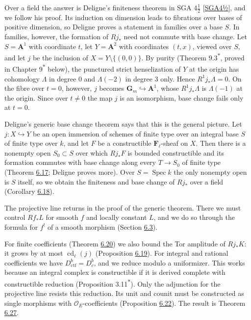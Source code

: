 \documentclass[11pt]{article}
\newcommand{\bpout}[1]{#1\textsuperscript{\hyperlink{bp-outside}{\ensuremath{\ast}}}}
\providecommand{\Dbc}{}\renewcommand{\Dbc}{D^b_c}
\providecommand{\Fell}{}\renewcommand{\Fell}{\mathbf F_\ell}
\begin{document}
Over a field the answer is Deligne's finiteness theorem in SGA 4\(\tfrac12\) [\hyperref[bp89]{SGA4½}], and we follow his proof. Its induction on dimension leads to fibrations over bases of positive dimension, so Deligne proves a statement in families over a base \(S\). In families, however, the formation of \(Rj_*\) need not commute with base change. Let \(S=\mathbf A^1\) with coordinate \(t\), let \(Y=\mathbf A^2\) with coordinates \((t,x)\), viewed over \(S\), and let \(j\) be the inclusion of \(X=Y\setminus\{(0,0)\}\). By purity (Theorem \bpout{9.3}, proved in Chapter \bpout{9} below), the punctured strict henselization of \(Y\) at the origin has cohomology \(\Lambda\) in degree \(0\) and \(\Lambda(-2)\) in degree \(3\) only. Hence \(R^1j_*\Lambda=0\). On the fibre over \(t=0\), however, \(j\) becomes \(\mathbf G_m\hookrightarrow\mathbf A^1\), whose \(R^1j_*\Lambda\) is \(\Lambda(-1)\) at the origin. Since over \(t\neq0\) the map \(j\) is an isomorphism, base change fails only at \(t=0\).

Deligne's generic base change theorem says that this is the general picture. Let \(j:X\hookrightarrow Y\) be an open immersion of schemes of finite type over an integral base \(S\) of finite type over \(k\), and let \(F\) be a constructible \(\Fell\)-sheaf on \(X\). Then there is a nonempty open \(S_0\subset S\) over which \(Rj_*F\) is bounded constructible and its formation commutes with base change along every \(T\to S_0\) of finite type (Theorem \hyperref[bp51]{6.17}; Deligne proves more). Over \(S=\operatorname{Spec}k\) the only nonempty open is \(S\) itself, so we obtain the finiteness and base change of \(Rj_*\) over a field (Corollary \hyperref[bp54]{6.18}).

The projective line returns in the proof of the generic theorem. There we must control \(Rf_*L\) for smooth \(f\) and locally constant \(L\), and we do so through the formula for \(f^!\) of a smooth morphism (Section \hyperref[bp24]{6.3}).

For finite coefficients (Theorem \hyperref[bp61]{6.20}) we also bound the Tor amplitude of \(Rj_*K\): it grows by at most \(\operatorname{cd}_\ell(j)\) (Proposition \hyperref[bp58]{6.19}). For integral and rational coefficients we have \(D^b_{\mathrm{ctf}}=\Dbc\), and we reduce modulo a uniformizer. This works because an integral complex is constructible if it is derived complete with constructible reduction (Proposition \bpout{3.11}). Only the adjunction for the projective line resists this reduction. Its unit and counit must be constructed as single morphisms with \(\mathcal O_E\)-coefficients (Proposition \hyperref[bp69]{6.22}). The result is Theorem \hyperref[bp84]{6.27}.
\end{document}
